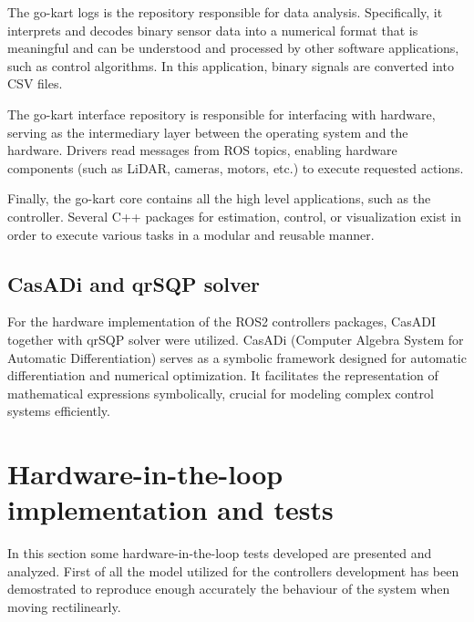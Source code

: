 \documentclass[a4paper,12pt,oneside]{book}
\begin{document}
The go-kart logs is the repository responsible for data analysis. 
Specifically, it interprets and decodes binary sensor data into a numerical format that is meaningful and can be understood and processed by other software applications, such as control algorithms.
In this application, binary signals are converted into CSV files.

The go-kart interface repository is responsible for interfacing with hardware, serving as the intermediary layer between the operating system and the hardware. 
Drivers read messages from ROS topics, enabling hardware components (such as LiDAR, cameras, motors, etc.) to execute requested actions.

Finally, the go-kart core contains all the high level applications, such as the controller. 
Several C++ packages for estimation, control, or visualization exist in order to execute various tasks in a modular and reusable manner.

\subsection*{CasADi and qrSQP solver}
For the hardware implementation of the ROS2 controllers packages, CasADI together with qrSQP solver were utilized.
CasADi (Computer Algebra System for Automatic Differentiation) \cite{Andersson2018} serves as a symbolic framework designed for automatic differentiation and numerical optimization.
It facilitates the representation of mathematical expressions symbolically, crucial for modeling complex control systems efficiently.


\section{Hardware-in-the-loop implementation and tests}
In this section some hardware-in-the-loop tests developed are presented and analyzed.
First of all the model utilized for the controllers development has been demostrated to reproduce enough accurately the behaviour of the system when moving rectilinearly.
\end{document}
